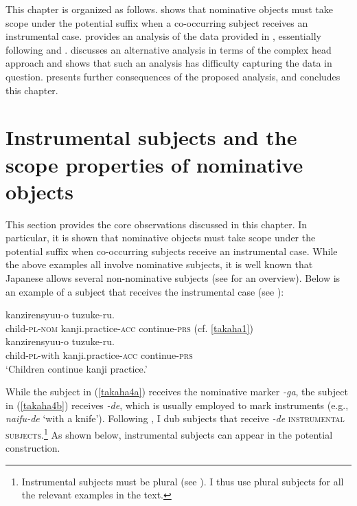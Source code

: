 \documentclass[output=paper]{langscibook}
\begin{document}
This chapter is organized as follows.  shows that nominative objects must take scope under the potential suffix when a co-occurring subject receives an instrumental case.  provides an analysis of the data provided in , essentially following \citet{Kishimoto2010} and \citet{shimamurawurmbrand2014}.  discusses an alternative analysis in terms of the complex head approach and shows that such an analysis has difficulty capturing the data in question.  presents further consequences of the proposed analysis, and  concludes this chapter.

\section{Instrumental subjects and the scope properties of nominative objects} \label{takahas2}

This section provides the core observations discussed in this chapter. In particular, it is shown that nominative objects must take scope under the potential suffix when co-occurring subjects receive an instrumental case. While the above examples all involve nominative subjects, it is well known that Japanese allows several non-nominative subjects (see \citealt{Kishimoto2017} for an overview). Below is an example of a subject that receives the instrumental case (see \citealt{Kishimoto2005,Kishimoto2010, Takubo1984, Inoue1998}):


\begin{exe}
\ex 
\begin{xlist}

\ex \label{takaha4a}
 {kanzirensyuu-o} {tuzuke-ru.}\\
	child-\textsc{pl}-\textsc{nom}  kanji.practice-\textsc{acc} continue-\textsc{prs} (cf. \ref{takaha1})\\ 
	
\ex \label{takaha4b}
 {kanzirensyuu-o} {tuzuke-ru.}\\
	child-\textsc{pl}-with       kanji.practice-\textsc{acc} continue-\textsc{prs}\\
\glt `Children continue kanji practice.' \\
\end{xlist}
\end{exe}

While the subject in (\ref{takaha4a}) receives the nominative marker \emph{-ga}, the subject in (\ref{takaha4b}) receives \emph{-de}, which is usually employed to mark instruments (e.g., \emph{naifu-de} `with a knife’). Following \citet{Kishimoto2005,Kishimoto2010}, I dub subjects that receive \emph{-de} \textsc{instrumental subjects}.\footnote{Instrumental subjects must be plural (see \citealt{Takubo1984, Kishimoto2005, Kishimoto2010}). I thus use plural subjects for all the relevant examples in the text.} As shown below, instrumental subjects can appear in the potential construction.
\end{document}

